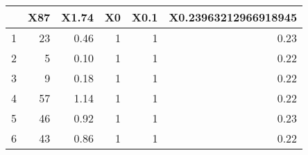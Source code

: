 \begin{table}[ht]
\centering
\begin{tabular}{rrrrrr}
  \hline
 & X87 & X1.74 & X0 & X0.1 & X0.23963212966918945 \\ 
  \hline
1 &  23 & 0.46 &   1 &   1 & 0.23 \\ 
  2 &   5 & 0.10 &   1 &   1 & 0.22 \\ 
  3 &   9 & 0.18 &   1 &   1 & 0.22 \\ 
  4 &  57 & 1.14 &   1 &   1 & 0.22 \\ 
  5 &  46 & 0.92 &   1 &   1 & 0.23 \\ 
  6 &  43 & 0.86 &   1 &   1 & 0.22 \\ 
   \hline
\end{tabular}
\end{table}
